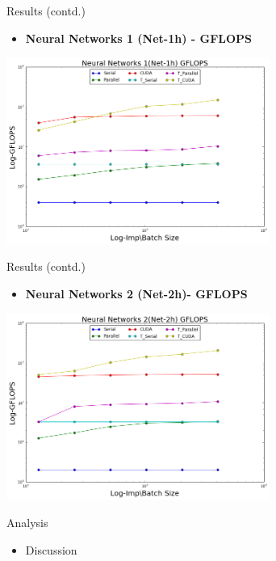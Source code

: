 \begin{frame}{Results (contd.)}
     \begin{itemize}
         \item{ \textbf{Neural Networks 1 (Net-1h) - GFLOPS}
         }
     \end{itemize}
     
		\begin{center}
		\includegraphics[width=3.4in]{nn1_gflops.png}
		\end{center}

 \end{frame} 

\begin{frame}{Results (contd.)}
     \begin{itemize}
         \item{ \textbf{Neural Networks 2 (Net-2h)- GFLOPS}
         }
     \end{itemize}
     
		\begin{center}
		\includegraphics[width=3.4in]{nn2_gflops.png}
		\end{center}

 \end{frame} 

 
 \begin{frame}{Analysis}
 	\begin{itemize}
 	\item {Discussion}
 	\end{itemize}
 
 \end{frame}



